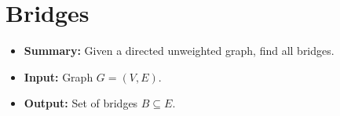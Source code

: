 \section{Bridges} \label{algorithm-bridges}
\begin{itemize}
    \item \textbf{Summary:} Given a directed unweighted graph, find all bridges.
    \item \textbf{Input:} Graph $G=(V,E)$.
    \item \textbf{Output:} Set of bridges $B \subseteq E$.
\end{itemize}

